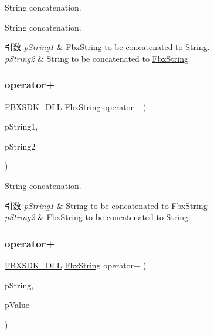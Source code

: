 String concatenation. 

String concatenation. 
\begin{DoxyParams}{引数}
{\em p\+String1} & \hyperlink{class_fbx_string}{Fbx\+String} to be concatenated to String. \\
\hline
{\em p\+String2} & String to be concatenated to \hyperlink{class_fbx_string}{Fbx\+String} \\
\hline
\end{DoxyParams}
\mbox{\label{class_fbx_string_a743035bdca2dc41d72054a797b5ab609}} 
\subsubsection{\texorpdfstring{operator+}{operator+}\hspace{0.1cm}{\footnotesize\ttfamily [5/10]}}
{\footnotesize\ttfamily \hyperlink{fbxarch_8h_a25d1298b33c31da5dbed969e0d4b4bc1}{F\+B\+X\+S\+D\+K\+\_\+\+D\+LL} \hyperlink{class_fbx_string}{Fbx\+String} operator+ (\begin{DoxyParamCaption}\item[{const char $\ast$}]{p\+String1,  }\item[{const \hyperlink{class_fbx_string}{Fbx\+String} \&}]{p\+String2 }\end{DoxyParamCaption})\hspace{0.3cm}{\ttfamily [friend]}}

String concatenation. 
\begin{DoxyParams}{引数}
{\em p\+String1} & String to be concatenated to \hyperlink{class_fbx_string}{Fbx\+String} \\
\hline
{\em p\+String2} & \hyperlink{class_fbx_string}{Fbx\+String} to be concatenated to String. \\
\hline
\end{DoxyParams}
\mbox{\label{class_fbx_string_a47e12177b25793bc4dbee111b17b433d}} 
\subsubsection{\texorpdfstring{operator+}{operator+}\hspace{0.1cm}{\footnotesize\ttfamily [6/10]}}
{\footnotesize\ttfamily \hyperlink{fbxarch_8h_a25d1298b33c31da5dbed969e0d4b4bc1}{F\+B\+X\+S\+D\+K\+\_\+\+D\+LL} \hyperlink{class_fbx_string}{Fbx\+String} operator+ (\begin{DoxyParamCaption}\item[{const \hyperlink{class_fbx_string}{Fbx\+String} \&}]{p\+String,  }\item[{int}]{p\+Value }\end{DoxyParamCaption})\hspace{0.3cm}{\ttfamily [friend]}}



